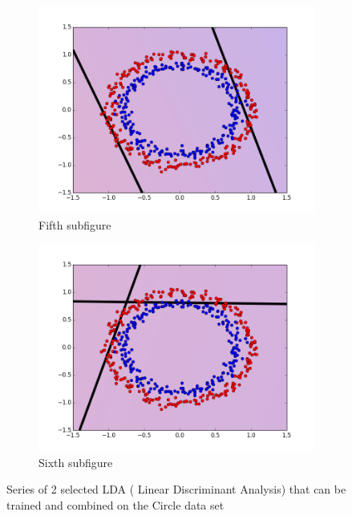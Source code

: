 \begin{figure}[H]
\medskip
\begin{subfigure}{0.48\textwidth}
\includegraphics[width=\linewidth]{figs/Circle/55-two-circle}
\caption{Fifth subfigure} \label{fig:Circle_all_single_e}
\end{subfigure}\hspace*{\fill}
\begin{subfigure}{0.48\textwidth}
\includegraphics[width=\linewidth]{figs/Circle/66-two-circle}
\caption{Sixth subfigure} \label{fig:Circle_all_single_f}
\end{subfigure}

\caption{Series of 2 selected LDA ( Linear Discriminant Analysis) that can be trained and combined on the Circle data set} \label{fig:Circle_all_single}
\end{figure}

